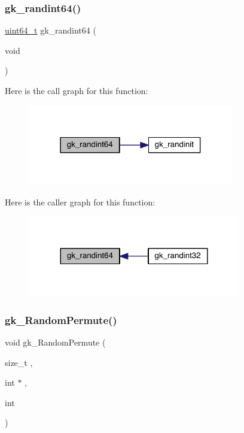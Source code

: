 \subsubsection{\texorpdfstring{gk\+\_\+randint64()}{gk\_randint64()}}
{\footnotesize\ttfamily \hyperlink{a00119_aec6fcb673ff035718c238c8c9d544c47}{uint64\+\_\+t} gk\+\_\+randint64 (\begin{DoxyParamCaption}\item[{void}]{ }\end{DoxyParamCaption})}

Here is the call graph for this function\+:\nopagebreak
\begin{figure}[H]
\begin{center}
\leavevmode
\includegraphics[width=256pt]{a00077_a2a2322fc19f0dfd85b92cf6325c743a2_cgraph}
\end{center}
\end{figure}
Here is the caller graph for this function\+:\nopagebreak
\begin{figure}[H]
\begin{center}
\leavevmode
\includegraphics[width=264pt]{a00077_a2a2322fc19f0dfd85b92cf6325c743a2_icgraph}
\end{center}
\end{figure}
\mbox{\label{a00077_a5e492a6be11a9bab7639220e6da7659d}} 
\subsubsection{\texorpdfstring{gk\+\_\+\+Random\+Permute()}{gk\_RandomPermute()}}
{\footnotesize\ttfamily void gk\+\_\+\+Random\+Permute (\begin{DoxyParamCaption}\item[{size\+\_\+t}]{,  }\item[{int $\ast$}]{,  }\item[{int}]{ }\end{DoxyParamCaption})}

